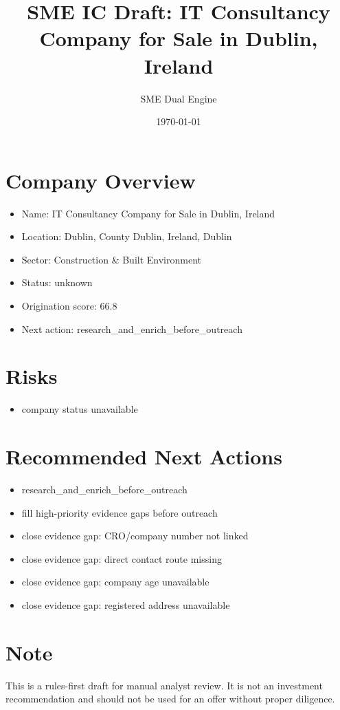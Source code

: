 \documentclass[11pt,a4paper]{article}
\title{SME IC Draft: IT Consultancy Company for Sale in Dublin, Ireland}
\author{SME Dual Engine}
\date{\today}
\begin{document}
\maketitle
\section*{Company Overview}
\begin{itemize}[leftmargin=1.4em]
\item Name: IT Consultancy Company for Sale in Dublin, Ireland
\item Location: Dublin, County Dublin, Ireland, Dublin
\item Sector: Construction \& Built Environment
\item Status: unknown
\item Origination score: 66.8
\item Next action: research\_and\_enrich\_before\_outreach
\end{itemize}
\section*{Risks}
\begin{itemize}[leftmargin=1.4em]
\item company status unavailable
\end{itemize}
\section*{Recommended Next Actions}
\begin{itemize}[leftmargin=1.4em]
\item research\_and\_enrich\_before\_outreach
\item fill high-priority evidence gaps before outreach
\item close evidence gap: CRO/company number not linked
\item close evidence gap: direct contact route missing
\item close evidence gap: company age unavailable
\item close evidence gap: registered address unavailable
\end{itemize}
\section*{Note}
This is a rules-first draft for manual analyst review. It is not an investment
recommendation and should not be used for an offer without proper diligence.
\end{document}

